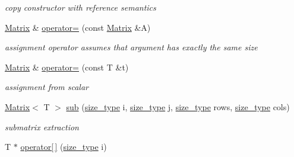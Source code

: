 \begin{DoxyCompactItemize}
\begin{DoxyCompactList}\small\item\em copy constructor with reference semantics \item\end{DoxyCompactList}\item 
\hypertarget{classhdnum_1_1Matrix_ad069ec9fdbef159b0069e325bd9bc064}{
\hyperlink{classhdnum_1_1Matrix}{Matrix} \& \hyperlink{classhdnum_1_1Matrix_ad069ec9fdbef159b0069e325bd9bc064}{operator=} (const \hyperlink{classhdnum_1_1Matrix}{Matrix} \&A)}
\label{classhdnum_1_1Matrix_ad069ec9fdbef159b0069e325bd9bc064}

\begin{DoxyCompactList}\small\item\em assignment operator assumes that argument has exactly the same size \item\end{DoxyCompactList}\item 
\hypertarget{classhdnum_1_1Matrix_a5ee9bbcecaa5fca03210f40e4d9f9b35}{
\hyperlink{classhdnum_1_1Matrix}{Matrix} \& \hyperlink{classhdnum_1_1Matrix_a5ee9bbcecaa5fca03210f40e4d9f9b35}{operator=} (const T \&t)}
\label{classhdnum_1_1Matrix_a5ee9bbcecaa5fca03210f40e4d9f9b35}

\begin{DoxyCompactList}\small\item\em assignment from scalar \item\end{DoxyCompactList}\item 
\hypertarget{classhdnum_1_1Matrix_a25e70187797f88c4ccf2f68fe79a7e86}{
\hyperlink{classhdnum_1_1Matrix}{Matrix}$<$ T $>$ \hyperlink{classhdnum_1_1Matrix_a25e70187797f88c4ccf2f68fe79a7e86}{sub} (\hyperlink{classhdnum_1_1Matrix_adeafaf5fa5732e0d67f90ffa2119fbf1}{size\_\-type} i, \hyperlink{classhdnum_1_1Matrix_adeafaf5fa5732e0d67f90ffa2119fbf1}{size\_\-type} j, \hyperlink{classhdnum_1_1Matrix_adeafaf5fa5732e0d67f90ffa2119fbf1}{size\_\-type} rows, \hyperlink{classhdnum_1_1Matrix_adeafaf5fa5732e0d67f90ffa2119fbf1}{size\_\-type} cols)}
\label{classhdnum_1_1Matrix_a25e70187797f88c4ccf2f68fe79a7e86}

\begin{DoxyCompactList}\small\item\em submatrix extraction \item\end{DoxyCompactList}\item 
\hypertarget{classhdnum_1_1Matrix_a70d073fcf197cf4ac085bb667b156ba3}{
T $\ast$ \hyperlink{classhdnum_1_1Matrix_a70d073fcf197cf4ac085bb667b156ba3}{operator\mbox{[}$\,$\mbox{]}} (\hyperlink{classhdnum_1_1Matrix_adeafaf5fa5732e0d67f90ffa2119fbf1}{size\_\-type} i)}
\label{classhdnum_1_1Matrix_a70d073fcf197cf4ac085bb667b156ba3}


\end{DoxyCompactItemize}
